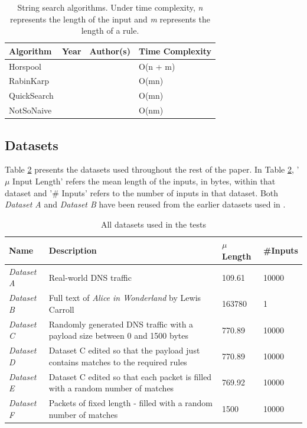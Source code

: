 \documentclass[11pt]{article}
\begin{document}
\begin{table}[!hbt]
\centering
\begin{tabular}{@{}llll@{}}
  \toprule
  Algorithm & Year & Author(s) & Time Complexity \\ \midrule
  Horspool & \citeyear{horspool1980} & \citeauthor{horspool1980} & O(n + m) \\
  RabinKarp & \citeyear{karp1987} & \citeauthor{karp1987} & O(mn) \\
  QuickSearch & \citeyear{sunday1990} & \citeauthor{sunday1990} & O(mn) \\
  NotSoNaive & \citeyear{hancart1993} & \citeauthor{hancart1993} & O(nm) \\ \bottomrule
 \end{tabular}
\caption{String search algorithms. Under time complexity, \textit{n} represents the length of the input and \textit{m} represents the length of a rule.}
\label{table-algorithms}
\end{table}

\subsection{Datasets}

Table \ref{table-datasets} presents the datasets used throughout the rest of the paper. In Table \ref{table-datasets}, '$\mu$ Input Length' refers the mean length of the inputs, in bytes, within that dataset and '\# Inputs' refers to the number of inputs in that dataset. Both \textit{Dataset A} and \textit{Dataset B} have been reused from the earlier datasets used in \citet{hunt2016}.

\begin{table}[!htb]
\centering
\begin{tabular}{@{}lp{}ll@{}}
\toprule
Name & Description & $\mu$ Length & \#Inputs \\ \midrule
\textit{Dataset A} & Real-world DNS traffic & 109.61 & 10000 \\
\textit{Dataset B} & Full text of \textit{Alice in Wonderland} by Lewis Carroll & 163780 & 1 \\
\textit{Dataset C} & Randomly generated DNS traffic with a payload size between 0 and 1500 bytes & 770.89 & 10000 \\
\textit{Dataset D} & Dataset C edited so that the payload just contains matches to the required rules & 770.89 & 10000 \\
\textit{Dataset E} & Dataset C edited so that each packet is filled with a random number of matches & 769.92 & 10000 \\
\textit{Dataset F} & Packets of fixed length - filled with a random number of matches & 1500 & 10000 \\ \bottomrule
\end{tabular}
\caption{All datasets used in the tests}
\label{table-datasets}
\end{table}
\end{document}
